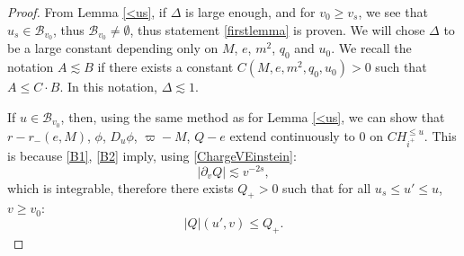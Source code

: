 \documentclass[10pt,a4paper]{article}
\theoremstyle{plain}
\theoremstyle{remark}
\theoremstyle{definition}
\theoremstyle{plain}
\theoremstyle{remark}
\theoremstyle{definition}
\numberwithin{equation}{section}
\begin{document}
\begin{proof}
	
	
	
	
	From Lemma \ref{<us}, if $\Delta$ is large enough, and for $v_0 \geq v_s$, we see that $u_s \in \mathcal{B}_{v_0}$, thus $\mathcal{B}_{v_0} \neq \emptyset$, thus statement \ref{firstlemma} is proven. We will chose $\Delta$ to be a large constant depending only on $M$, $e$, $m^2$, $q_0$ and $u_0$. We recall the notation $A \lesssim B$ if there exists a constant $C(M, e, m^2, q_0,u_0)>0$ such that $A \leq C \cdot B$. In this notation, $\Delta \lesssim 1$.
	
	If $u\in \mathcal{B}_{v_0}$, then, using the same method as for Lemma \ref{<us}, we can show that $r-r_-(e,M)$, $\phi$, $D_u \phi$, $\varpi-M$, $Q-e$ extend continuously to $0$ on $CH^{\leq u}_{i^+}$. This is because \eqref{B1}, \eqref{B2} imply, using \eqref{ChargeVEinstein}: $$ |\partial_v Q| \lesssim  v^{-2s},$$ which is integrable, therefore there exists $Q_+>0$ such that for all $u_s \leq u' \leq u$, $v \geq v_0$: $$|Q|(u',v) \leq Q_+.$$
	

\end{proof}
\end{document}
